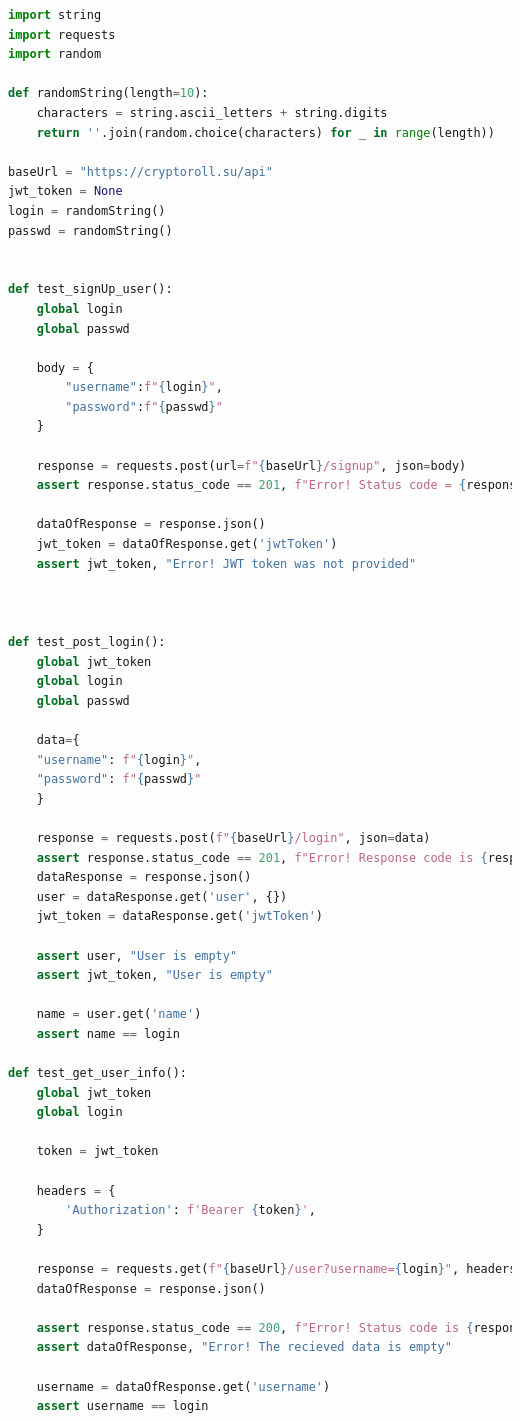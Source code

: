 \documentclass[a4paper, 12pt]{article}
\begin{document}
\begin{lstlisting}[language=python, caption={Код для тестирования API}]
import string
import requests
import random

def randomString(length=10):
    characters = string.ascii_letters + string.digits
    return ''.join(random.choice(characters) for _ in range(length))

baseUrl = "https://cryptoroll.su/api"
jwt_token = None
login = randomString()
passwd = randomString()


def test_signUp_user():
    global login
    global passwd

    body = {
        "username":f"{login}",
        "password":f"{passwd}"
    }

    response = requests.post(url=f"{baseUrl}/signup", json=body)
    assert response.status_code == 201, f"Error! Status code = {response.status_code}"

    dataOfResponse = response.json()
    jwt_token = dataOfResponse.get('jwtToken')
    assert jwt_token, "Error! JWT token was not provided"
    
    

def test_post_login():
    global jwt_token
    global login
    global passwd

    data={
    "username": f"{login}",
    "password": f"{passwd}"
    }

    response = requests.post(f"{baseUrl}/login", json=data)
    assert response.status_code == 201, f"Error! Response code is {response.status_code}"
    dataResponse = response.json()
    user = dataResponse.get('user', {})
    jwt_token = dataResponse.get('jwtToken')

    assert user, "User is empty"
    assert jwt_token, "User is empty"

    name = user.get('name')
    assert name == login

def test_get_user_info():
    global jwt_token
    global login

    token = jwt_token

    headers = {
        'Authorization': f'Bearer {token}',
    }

    response = requests.get(f"{baseUrl}/user?username={login}", headers=headers)
    dataOfResponse = response.json()

    assert response.status_code == 200, f"Error! Status code is {response.status_code}"
    assert dataOfResponse, "Error! The recieved data is empty"

    username = dataOfResponse.get('username')
    assert username == login


\end{lstlisting}
\end{document}
